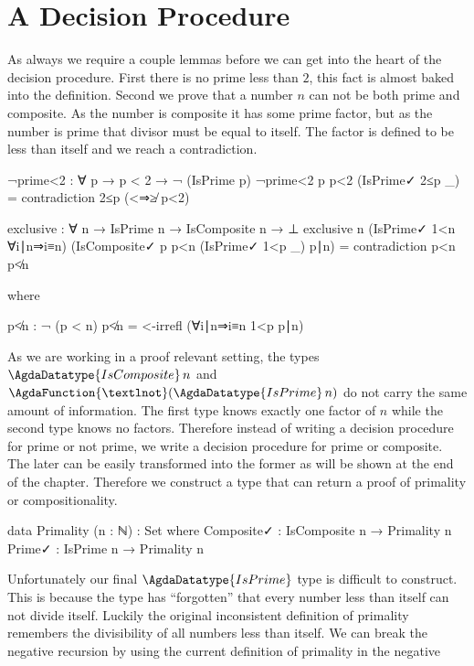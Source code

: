 \documentclass[./Thesis.tex]{subfiles}
\begin{document}
\section{A Decision Procedure}
\label{sec:a-decision-procedure}
As always we require a couple lemmas before we can get into the heart of the
decision procedure. First there is no prime less than $2$, this fact is almost
baked into the definition. Second we prove that a number $n$ can not be both prime and
composite. As the number is composite it has some prime factor, but as the
number is prime that divisor must be equal to itself. The factor is defined to
be less than itself and we reach a contradiction.
\begin{code}
  ¬prime<2 : ∀ p → p < 2 → ¬ (IsPrime p)
  ¬prime<2 p p<2 (IsPrime✓ 2≤p _) = contradiction 2≤p (<⇒≱ p<2)
\end{code}
\begin{code}
  exclusive : ∀ {n} → IsPrime n → IsComposite n → ⊥
  exclusive {n}
    (IsPrime✓ 1<n ∀i∣n⇒i≡n)
    (IsComposite✓ p p<n (IsPrime✓ 1<p _) p∣n)
    = contradiction p<n p≮n
\end{code}
\begin{code}[hide]
    where
\end{code}
\begin{code}
    p≮n : ¬ (p < n)
    p≮n = <-irrefl (∀i∣n⇒i≡n 1<p p∣n)
\end{code}
As we are working in a proof relevant setting, the types
$\AgdaDatatype{IsComposite} \, n$ and
$\AgdaFunction{¬} (\AgdaDatatype{IsPrime}\, n)$ do not carry the same amount of
information. The first type knows exactly one factor of $n$ while the
second type knows no factors. Therefore instead of writing a decision procedure
for prime or not prime, we write a decision procedure for prime or composite. The
later can be easily transformed into the former as will be shown at the end of the
chapter. Therefore we construct a type that can return a proof of primality or
compositionality.
\begin{code}
  data Primality (n : ℕ) : Set where
    Composite✓ : IsComposite n → Primality n
    Prime✓ : IsPrime n → Primality n
\end{code}
Unfortunately our final $\AgdaDatatype{IsPrime}$ type is difficult to construct.
This is because the type has ``forgotten'' that every number less than itself
can not divide itself. Luckily the original inconsistent definition of primality
remembers the divisibility of all numbers less than itself. We can break the
negative recursion by using the current definition of primality in the negative
\end{document}
